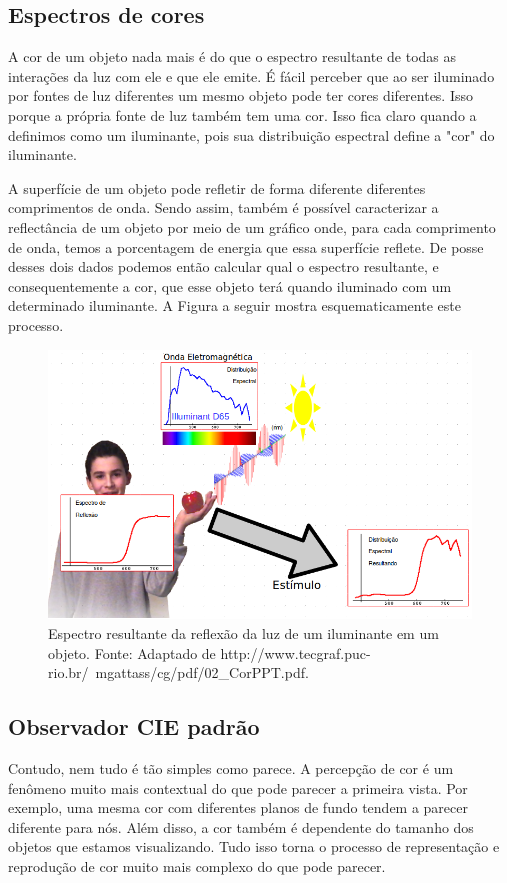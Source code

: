 \documentclass[a4paper,10pt]{report}
\begin{document}
\subsection{Espectros de cores}
\par
A cor de um objeto nada mais é do que o espectro resultante de todas as
interações da luz com ele e que ele emite. É fácil perceber que ao ser iluminado
por fontes de luz diferentes um mesmo objeto pode ter cores diferentes. Isso
porque a própria fonte de luz também tem uma cor. Isso fica claro quando a
definimos como um iluminante, pois sua distribuição espectral define a "cor" do
iluminante.

\par
A superfície de um objeto pode refletir de forma diferente diferentes
comprimentos de onda. Sendo assim, também é possível caracterizar a
reflectância de um objeto por meio de um gráfico onde, para cada comprimento de
onda, temos a porcentagem de energia que essa superfície reflete. De posse
desses dois dados podemos então calcular qual o espectro resultante, e
consequentemente a cor, que esse objeto terá quando iluminado com um
determinado iluminante. A Figura a seguir mostra esquematicamente este processo.

\begin{figure}[!htb]
     \centering
     \includegraphics[scale=0.9]{img/spectrum_reflection.png}
     \caption{Espectro resultante da reflexão da luz de um iluminante em
um objeto. Fonte: Adaptado de 
{http://www.tecgraf.puc-rio.br/~mgattass/cg/pdf/02_CorPPT.pdf}.}
     \label{fig:spectrum_reflection}
\end{figure}

\subsection{Observador CIE padrão}
\par
Contudo, nem tudo é tão simples como parece. A percepção de cor é um fenômeno
muito mais contextual do que pode parecer a primeira vista. Por exemplo, uma
mesma cor com diferentes planos de fundo tendem a parecer diferente para nós.
Além disso, a cor também é dependente do tamanho dos objetos que estamos
visualizando. Tudo isso torna o processo de representação e reprodução de cor
muito mais complexo do que pode parecer.
\end{document}
